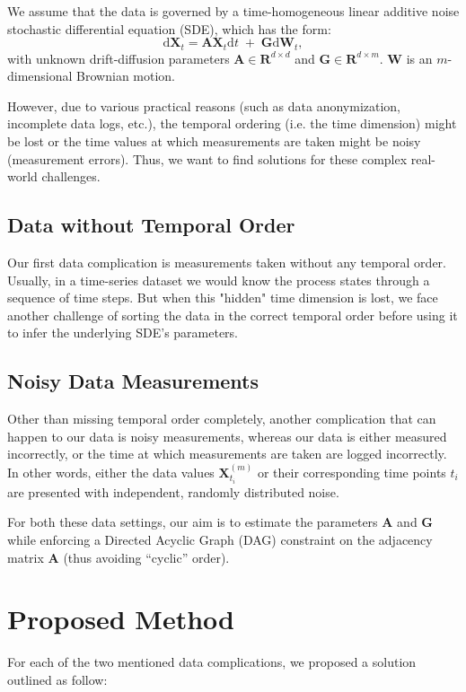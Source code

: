 \documentclass[a4paper, 11pt]{article}
\begin{document}
\begin{sloppypar}
We assume that the data is governed by a time-homogeneous linear additive noise stochastic
differential equation (SDE), which has the form:
\[
\mathrm{d}\mathbf{X}_t 
= 
\mathbf{A}\mathbf{X}_t\mathrm{d}t 
\;+\; 
\mathbf{G}\mathrm{d}\mathbf{W}_t,
\]
with unknown drift-diffusion parameters $\mathbf{A} \in \mathbf{R}^{d \times d}$ and
$\mathbf{G} \in \mathbf{R}^{d \times m}$. $\mathbf{W}$ is an $m$-dimensional Brownian motion.

However, due to various practical reasons (such as data anonymization, 
incomplete data logs, etc.), the temporal ordering
(i.e. the time dimension) might be lost or the time values 
at which measurements are taken might be noisy (measurement errors).
Thus, we want to find solutions for these complex real-world challenges.

\subsection{Data without Temporal Order}
Our first data complication is measurements taken without any temporal order. Usually,
in a time-series dataset we would know the process states through a sequence of time steps.
But when this "hidden" time dimension is lost, we face another challenge of sorting the data
in the correct temporal order before using it to infer the underlying SDE's parameters.

\subsection{Noisy Data Measurements}
Other than missing temporal order completely, another complication that can happen to
our data is noisy measurements, whereas our data is either measured incorrectly,
or the time at which measurements are taken are logged incorrectly. In other words,
either the data values $\mathbf{X}_{t_{i}}^{(m)}$ or their corresponding time points
$t_{i}$ are presented with independent,
randomly distributed noise.

For both these data settings, our aim is to estimate the parameters $\mathbf{A}$ and
$\mathbf{G}$ while enforcing a Directed Acyclic Graph (DAG) constraint on the
adjacency matrix $\mathbf{A}$ (thus avoiding ``cyclic'' order).

\section{Proposed Method}\label{s:2}
For each of the two mentioned data complications, we proposed a solution outlined as follow:


\end{sloppypar}
\end{document}
